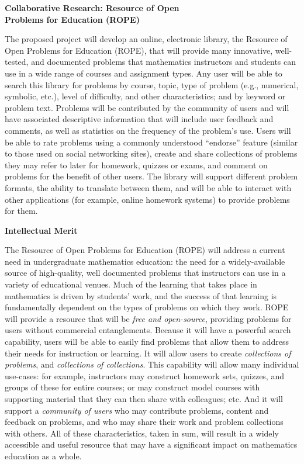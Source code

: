 \documentclass[11pt]{article}
\begin{document}
\begin{center}
{\Large \textbf{Collaborative Research: Resource of Open\\
Problems for Education (ROPE)}}
\end{center}

\bigskip
\noindent
The proposed project will develop an online, electronic library, the Resource of Open Problems for Education (ROPE), that will
provide many innovative, well-tested, and documented problems
that mathematics instructors and students can use in a wide range of courses and assignment types.  Any user will be able to search this
library for problems by course, topic, type of problem (e.g.,
numerical, symbolic, etc.), level of difficulty, and other
characteristics; and by keyword or problem text.  Problems will be contributed by the community of users
and will have associated descriptive information that will include user
feedback and comments, as well as statistics on the frequency of the
problem's use.  Users will be able to rate problems using a commonly
understood ``endorse'' feature (similar to those used on social networking
sites), create and share collections of problems they may refer to later
for homework, quizzes or exams, and comment on problems for the benefit of
other users.  The library will support different problem formats, the
ability to translate between them, and will be able to interact with other
applications (for example, online homework systems) to provide problems
for them.

\bigskip\bigskip
\noindent
{\large \textbf{Intellectual Merit}}

The Resource of Open Problems for Education (ROPE) will address a current need in
undergraduate mathematics education: the need for a widely-available
source of high-quality, well documented problems that instructors can use
in a variety of educational venues.  Much of the learning that takes place in mathematics
is driven by students' work, and the success of that learning is
fundamentally dependent on the types of problems on which they work.  ROPE
will provide a resource that will be \emph{free and open-source},
providing problems for users without commercial entanglements.  Because it
will have a powerful search capability, users will be able to easily find
problems that allow them to address their needs for instruction or
learning.  It will allow users to create \emph{collections of problems},
and \emph{collections of collections}.  This capability will allow many
individual use-cases: for example, instructors may construct homework
sets, quizzes, and groups of these for entire courses; or may construct
model courses with supporting material that they can then share with
colleagues; etc.  And it will support a \emph{community of users} who may
contribute problems, content and feedback on problems, and who may share
their work and problem collections with others.  All of these
characteristics, taken in sum, will result in a widely accessible and
useful resource that may have a significant impact on mathematics
education as a whole.
\end{document}
